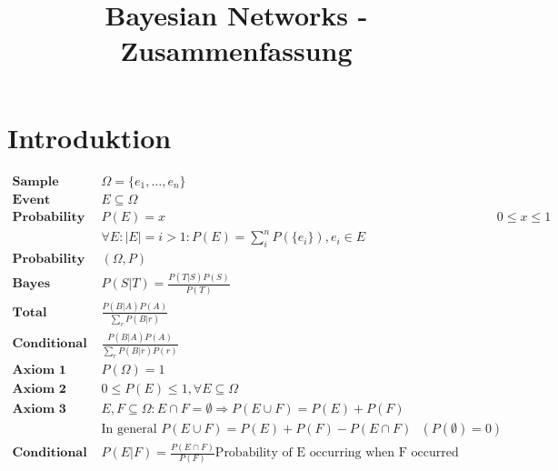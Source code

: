 \documentclass{article}
\title{Bayesian Networks - Zusammenfassung}
\newcommand{\prob}{\textit{P}}
\begin{document}
	\section*{Introduktion}
		\begin{align*}
			\textbf{Sample space } & \Omega = \{e_1, \ldots, e_n\}\\
			\textbf{Event } & E \subseteq \Omega\\
			\textbf{Probability function } & \prob(E) = x & 0 \leq x \leq 1\\
			& \forall E: |E| = i > 1: P(E) = \sum_{i}^{n}\prob(\{e_i\}), e_i \in E\\
			\textbf{Probability space } & (\Omega, \prob)\\
			\textbf{Bayes Theorem } & \prob(S|T) = \frac{\prob(T|S)\prob(S)}{\prob(T)}\\
			\textbf{Total Probability } & \frac{\prob (B | A) \prob (A)}{\sum\limits_{r}^{} \prob (B|r)}\\
			\textbf{Conditional Probability } & \frac{\prob (B | A) \prob (A)}{\sum\limits_{r}^{} \prob (B|r) \prob(r)}\\
			\textbf{Axiom 1 } & \prob(\Omega) = 1\\
			\textbf{Axiom 2 } & 0 \leq \prob(E) \leq 1, \forall E \subseteq \Omega\\
			\textbf{Axiom 3 } & E,F \subseteq \Omega: E \cap F = \emptyset \Rightarrow \prob(E \cup F) = \prob(E) + \prob(F)\\
			& \text{In general } \prob(E \cup F) = \prob(E) + \prob(F) - \prob(E \cap F)\ \ \ (\prob(\emptyset) = 0)\\
			\textbf{Conditional Probability } & \prob(E|F) = \frac{\prob(E\cap F)}{\prob(F)}\text{Probability of E occurring when F occurred} & \\
		\end{align*}
\end{document}
